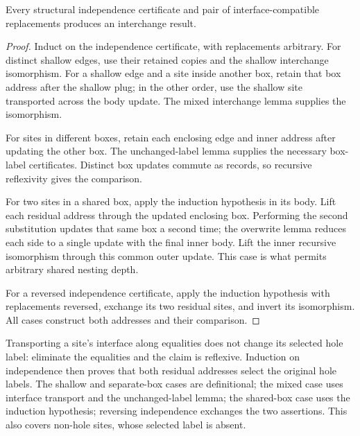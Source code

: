 \begin{theorem}
Every structural independence certificate and pair of interface-compatible
replacements produces an interchange result.
\end{theorem}
\begin{proof}
Induct on the independence certificate, with replacements arbitrary.
For distinct shallow edges, use their retained copies and the shallow
interchange isomorphism. For a shallow edge and a site inside another
box, retain that box address after the shallow plug; in the other order,
use the shallow site transported across the body update. The mixed
interchange lemma supplies the isomorphism.

For sites in different boxes, retain each enclosing edge and inner
address after updating the other box. The unchanged-label lemma supplies
the necessary box-label certificates. Distinct box updates commute as
records, so recursive reflexivity gives the comparison.

For two sites in a shared box, apply the induction hypothesis in its
body. Lift each residual address through the updated enclosing box.
Performing the second substitution updates that same box a second time;
the overwrite lemma reduces each side to a single update with the final
inner body. Lift the inner recursive isomorphism through this common
outer update. This case is what permits arbitrary shared nesting depth.

For a reversed independence certificate, apply the induction hypothesis
with replacements reversed, exchange its two residual sites, and invert
its isomorphism. All cases construct both addresses and their comparison.
\end{proof}

Transporting a site's interface along equalities does not change its
selected hole label: eliminate the equalities and the claim is reflexive.
Induction on independence then proves that both residual addresses
select the original hole labels. The shallow and separate-box cases
are definitional; the mixed case uses interface transport and the
unchanged-label lemma; the shared-box case uses the induction
hypothesis; reversing independence exchanges the two assertions.
This also covers non-hole sites, whose selected label is absent.

